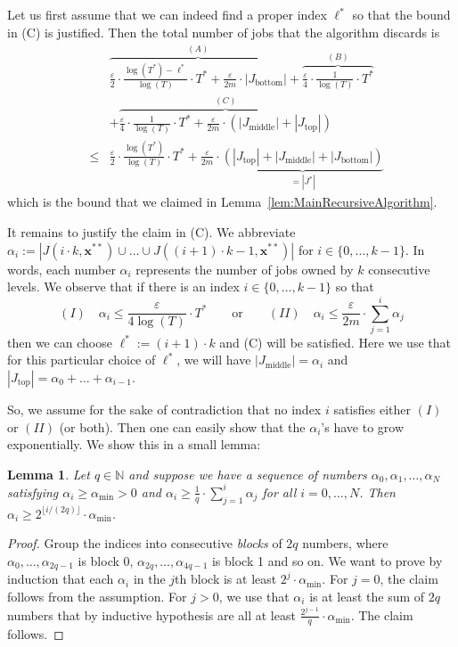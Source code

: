 \documentclass[11pt,letterpaper,oneside,english]{article}
\theoremstyle{theorem}
\newtheorem{lemma}[theorem]{Lemma}
\providecommand{\setN}{\mathbb{N}}
\begin{document}
Let us first assume that we can indeed find a proper index $\ell^*$ so that the bound in (C)
is justified. Then the total number of jobs that the algorithm discards
is
\begin{eqnarray*}
& & \overbrace{\frac{\varepsilon}{2} \cdot \frac{\log(T^*)-\ell^*}{\log(T)} \cdot T^* + \frac{\varepsilon}{2m} \cdot |J_{\textrm{bottom}}|}^{(A)} 
 + \overbrace{\frac{\varepsilon}{4} \cdot \frac{1}{\log(T)} \cdot T^*}^{(B)} \\
& & +\overbrace{\frac{\varepsilon}{4} \cdot \frac{1}{\log(T)} \cdot T^* + \frac{\varepsilon}{2m} \cdot (|J_{\textrm{middle}}| + |J_{\textrm{top}}|)}^{(C)} \\
&\leq& \frac{\varepsilon}{2} \cdot \frac{\log(T^*)}{\log(T)}\cdot T^* + \frac{\varepsilon}{2m} \cdot \underbrace{(|J_{\textrm{top}}| + |J_{\textrm{middle}}| + |J_{\textrm{bottom}}|)}_{=|J^*|}
\end{eqnarray*}
which is the bound that we claimed in Lemma~\ref{lem:MainRecursiveAlgorithm}. 

It remains to justify the claim in (C). 
We abbreviate   $\alpha_{i} := |J(i \cdot k,\bm{x}^{**}) \cup \ldots \cup J((i+1) \cdot k-1,\bm{x}^{**})|$ for  $i \in \{ 0,\ldots,k-1\}$. 
In words, each number $\alpha_i$ represents the number of jobs owned by $k$ consecutive levels. 
We observe that if there is an index $i \in \{ 0,\ldots,k-1\}$ so that 
\[
(I) \quad \alpha_i \leq \frac{\varepsilon}{4\log(T)} \cdot T^* \quad\quad \textrm{or} \quad\quad (II) \quad \alpha_i \leq \frac{\varepsilon}{2m} \cdot \sum_{j=1}^i \alpha_j
\]
then we can choose $\ell^* := (i+1) \cdot k$ and (C) will be satisfied. Here we use that for this particular choice of $\ell^*$, 
we will have $|J_{\textrm{middle}}| = \alpha_i$ and $|J_{\textrm{top}}| = \alpha_0 + \ldots + \alpha_{i-1}$.


So, we assume for the sake of contradiction that no index $i$ satisfies either $(I)$ or $(II)$ (or both). 
Then one can easily show that the $\alpha_i$'s have to grow exponentially. We show this in a small lemma:
\begin{lemma} \label{lem:GrowOfSequenceAlphaIs}
Let  $q \in \setN$ and suppose we have a sequence of numbers $\alpha_0,\alpha_1,\ldots,\alpha_{N}$ 
satisfying $\alpha_i \geq \alpha_{\min}>0$ and $\alpha_i \geq \frac{1}{q} \cdot \sum_{j=1}^i \alpha_j$ for all $i=0,\ldots,N$. 
Then $\alpha_i \geq 2^{\lfloor i/(2q) \rfloor} \cdot \alpha_{\min}$. 
\end{lemma}
\begin{proof}
Group the indices into consecutive \emph{blocks} of $2q$ numbers, where $\alpha_0,\ldots,\alpha_{2q-1}$ is 
block $0$, $\alpha_{2q},\ldots,\alpha_{4q-1}$ is block 1 and so on. We want to prove by induction that
each $\alpha_i$ in the $j$th block is at least $2^{j} \cdot \alpha_{\min}$. For $j=0$, the claim follows from the 
assumption. For $j>0$, we use that $\alpha_i$ is at least the sum of $2q$ numbers 
that by inductive hypothesis are all at least $\frac{2^{j-1}}{q} \cdot \alpha_{\min}$. The claim follows. 
\end{proof}
\end{document}
